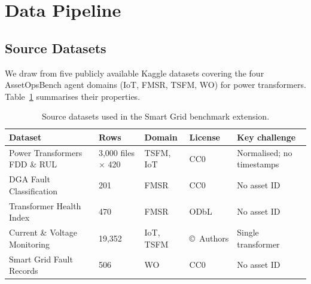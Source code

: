 %

\section{Data Pipeline}
\label{sec:data-pipeline}

\subsection{Source Datasets}
\label{sec:datasets}

We draw from five publicly available Kaggle datasets covering the four
AssetOpsBench agent domains (IoT, FMSR, TSFM, WO) for power transformers.
Table~\ref{tab:datasets} summarises their properties.

\begin{table}[h]
\centering
\caption{Source datasets used in the Smart Grid benchmark extension.}
\label{tab:datasets}
\begin{tabular}{lllll}
\hline
\textbf{Dataset} & \textbf{Rows} & \textbf{Domain} & \textbf{License} & \textbf{Key challenge} \\
\hline
Power Transformers FDD \& RUL~\cite{fddrul}
  & 3{,}000 files $\times$ 420 & TSFM, IoT & CC0 & Normalised; no timestamps \\
DGA Fault Classification~\cite{dga}
  & 201 & FMSR & CC0 & No asset ID \\
Transformer Health Index~\cite{healthindex}
  & 470 & FMSR & ODbL & No asset ID \\
Current \& Voltage Monitoring~\cite{monitoring}
  & 19{,}352 & IoT, TSFM & \copyright\ Authors & Single transformer \\
Smart Grid Fault Records~\cite{faultrecords}
  & 506 & WO & CC0 & No asset ID \\
\hline
\end{tabular}
\end{table}

